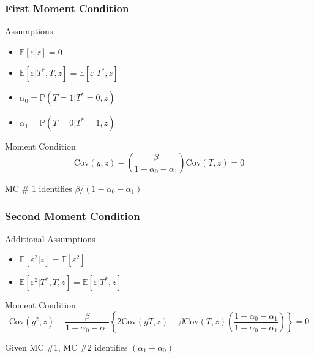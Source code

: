\documentclass{beamer}
\begin{document}
\begin{frame}
  \frametitle{First Moment Condition}
  \begin{block}{Assumptions}
    \begin{itemize}
      \item $\mathbb{E}[\varepsilon|z]=0$
      \item $\mathbb{E}[\varepsilon|T^*,T,z] =  \mathbb{E}[\varepsilon|T^*,z]$
      \item $\alpha_0 = \mathbb{P}(T = 1| T^* = 0, z)$ 
      \item  $\alpha_1 = \mathbb{P}(T = 0| T^* = 1, z)$ 
    \end{itemize}
  \end{block}

  \begin{block}{Moment Condition}
    \[\mbox{Cov}(y,z) - \left( \frac{\beta}{1 - \alpha_0 - \alpha_1} \right) \mbox{Cov}(T,z) = 0\]
  \end{block}

  \alert{MC \# 1 identifies $\beta/(1 - \alpha_0 - \alpha_1)$}
\end{frame}
\begin{frame}
  \frametitle{Second Moment Condition}
  \begin{block}{Additional Assumptions}
    \begin{itemize}
      \item $\mathbb{E}[\varepsilon^2|z]=\mathbb{E}[\varepsilon^2]$
      \item $\mathbb{E}[\varepsilon^2|T^*,T,z] =  \mathbb{E}[\varepsilon|T^*,z]$
    \end{itemize}
  \end{block}

  \begin{block}{Moment Condition}
    \small
  \[\mbox{Cov}(y^2,z) - \frac{\beta}{1 - \alpha_0 - \alpha_1}\left\{2\mbox{Cov}(yT,z)- \beta \mbox{Cov}(T,z)\left( \frac{1 + \alpha_0 - \alpha_1}{1 - \alpha_0 - \alpha_1} \right)  \right\} = 0\]
  \end{block}

  \alert{Given MC \#1, MC \#2 identifies $(\alpha_1 - \alpha_0)$}
\end{frame}
\end{document}
